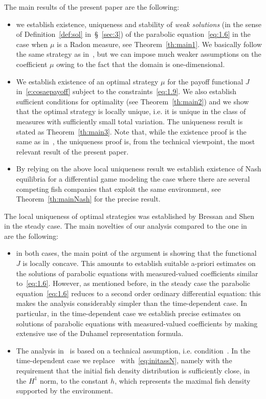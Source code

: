 \documentclass[11pt,leqno]{amsart}
\numberwithin{equation}{section}
\begin{document}
  
The main results of the present paper are the following:
\begin{itemize}
\item we establish existence, uniqueness and stability of  \emph{weak solutions} (in the sense of Definition~\ref{def:sol} in~\S~\ref{sec:3}) of the parabolic equation~\eqref{eq:1.6} in the case when $\mu$ is a Radon measure, see Theorem~\ref{th:main1}. We basically follow the same strategy as in~\cite{CG}, but we can impose much weaker assumptions on the coefficient $\mu$ owing to the fact that the domain is one-dimensional. 
\item We establish existence of an optimal strategy $\mu$ for the payoff functional $J$ in~\eqref{e:cosaepayoff} subject to the constraints~\eqref{eq:1.9}. We also establish sufficient conditions for optimality (see Theorem~\ref{th:main2}) and we show that the optimal strategy is locally unique, i.e. it is unique in the class of measures with sufficiently small total variation. The uniqueness result is stated as Theorem~\ref{th:main3}. Note that, while the existence proof is the same as in~\cite{BCS,CG}, the uniqueness proof is, from the technical viewpoint, the most relevant result of the present paper. 
\item By relying on the above local uniqueness result we establish existence of Nash equilibria for a differential game modeling the case where there are several competing fish companies that exploit the same environment, see Theorem~\ref{th:mainNash} for the precise result.  
\end{itemize}
The local uniqueness of optimal strategies was established by Bressan and Shen~\cite{BS1} in the steady case. The main novelties of our analysis compared to the one in~\cite{BS1} are the following:
\begin{itemize}
\item in both cases, the main point of the argument is showing that the functional $J$ is locally concave. This amounts to establish suitable a-priori estimates on the solutions of parabolic equations with measured-valued coefficients similar to~\eqref{eq:1.6}.  However, as mentioned before, in the steady case the parabolic equation~\eqref{eq:1.6} reduces to a second order ordinary differential equation: this makes the analysis considerably simpler than the time-dependent case. In particular, in the time-dependent case we establish precise estimates on solutions of parabolic equations with measured-valued coefficients by making extensive use of the Duhamel representation formula. 
\item The analysis in~\cite{BS1} is based on a technical assumption, i.e. condition~\cite[(5.15)]{BS1}. In the time-dependent case we replace~\cite[(5.15)]{BS1} with~\eqref{eq:initassN}, namely with the requirement that the initial fish density distribution is sufficiently close, in the $H^1$ norm, to the constant $h$, which represents the maximal fish density supported by the environment.   
\end{itemize}
\end{document}
